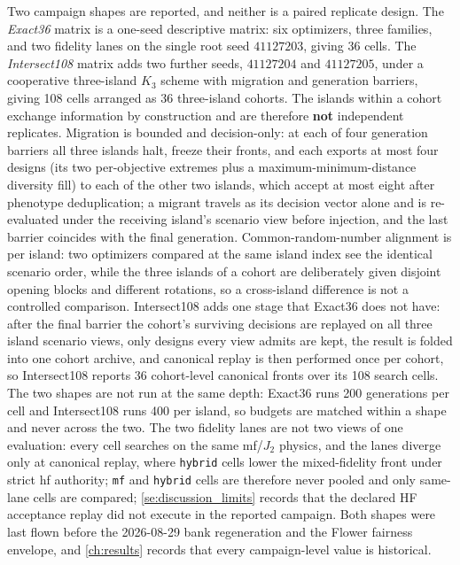         Two campaign shapes are reported, and neither is a paired replicate design. The \emph{Exact36} matrix is a one-seed descriptive matrix: six optimizers, three families, and two fidelity lanes on the single root seed \(41127203\), giving 36 cells. The \emph{Intersect108} matrix adds two further seeds, \(41127204\) and \(41127205\), under a cooperative three-island \(K_3\) scheme with migration and generation barriers, giving 108 cells arranged as 36 three-island cohorts. The islands within a cohort exchange information by construction and are therefore \textbf{not} independent replicates. Migration is bounded and decision-only: at each of four generation barriers all three islands halt, freeze their fronts, and each exports at most four designs (its two per-objective extremes plus a maximum-minimum-distance diversity fill) to each of the other two islands, which accept at most eight after phenotype deduplication; a migrant travels as its decision vector alone and is re-evaluated under the receiving island's scenario view before injection, and the last barrier coincides with the final generation. Common-random-number alignment is per island: two optimizers compared at the same island index see the identical scenario order, while the three islands of a cohort are deliberately given disjoint opening blocks and different rotations, so a cross-island difference is not a controlled comparison. Intersect108 adds one stage that Exact36 does not have: after the final barrier the cohort's surviving decisions are replayed on all three island scenario views, only designs every view admits are kept, the result is folded into one cohort archive, and canonical replay is then performed once per cohort, so Intersect108 reports 36 cohort-level canonical fronts over its 108 search cells. The two shapes are not run at the same depth: Exact36 runs 200 generations per cell and Intersect108 runs 400 per island, so budgets are matched within a shape and never across the two. The two fidelity lanes are not two views of one evaluation: every cell searches on the same \gls{mf}/\(J_2\) physics, and the lanes diverge only at canonical replay, where \texttt{hybrid} cells lower the mixed-fidelity front under strict \gls{hf} authority; \texttt{mf} and \texttt{hybrid} cells are therefore never pooled and only same-lane cells are compared; \cref{se:discussion_limits} records that the declared HF acceptance replay did not execute in the reported campaign. Both shapes were last flown before the 2026-08-29 bank regeneration and the Flower fairness envelope, and \cref{ch:results} records that every campaign-level value is historical.

